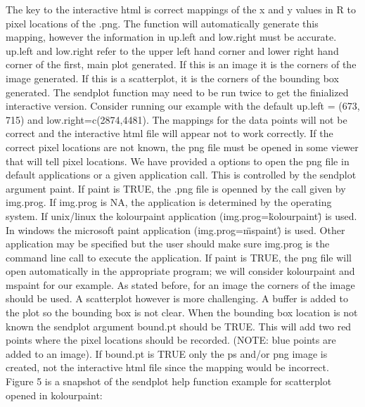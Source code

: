 \documentclass[]{article}
\begin{document}
\quad The key to the interactive html is correct mappings of the x and y values in R to pixel locations of the .png. The function will automatically generate this mapping, however the information in up.left and low.right must be accurate. up.left and low.right refer to the upper left hand corner and lower right hand corner of the first, main plot generated. If this is an image it is the corners of the image generated. If this is a scatterplot, it is the corners of the bounding box generated. The sendplot function may need to be run twice to get the finialized interactive version. Consider running our example with the default up.left = (673, 715) and low.right=c(2874,4481). The mappings for the data points will not be correct and the interactive html file will appear not to work correctly. If the correct pixel locations are not known, the png file must be opened in some viewer that will tell pixel locations. We have provided a options to open the png file in default applications or a given application call. This is controlled by the sendplot argument paint. If paint is TRUE, the .png file is openned by the call given by img.prog. If img.prog is NA, the application is determined by the operating system. If unix/linux the kolourpaint application (img.prog=\"kolourpaint\") is used. In windows the microsoft paint application (img.prog=\"mspaint\") is used. Other application may be specified but the user should make sure img.prog is the command line call to execute the application. If paint is TRUE, the png file will open automatically in the appropriate program; we will consider kolourpaint and mspaint for our example. As stated before, for an image the corners of the image should be used. A scatterplot however is more challenging. A buffer is added to the plot so the bounding box is not clear. When the bounding box location is not known the sendplot argument bound.pt should be TRUE. This will add two red points where the pixel locations should be recorded. (NOTE: blue points are added to an image). If bound.pt is TRUE only the ps and/or png image is created, not the interactive html file since the mapping would be incorrect. Figure 5 is a snapshot of the sendplot help function example for scatterplot opened in kolourpaint:
\end{document}
